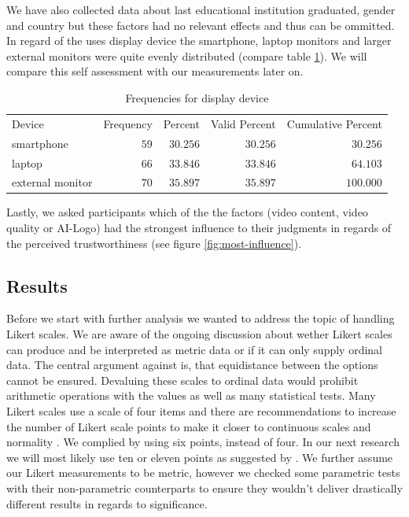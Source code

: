 \documentclass[
  a4paper,  %
  twoside,  %
  bibliography=totoc,
  headsepline,
  cleardoublepage=empty,
  parskip=half,
  draft=false
]{scrbook}
\begin{document}
We have also collected data about last educational institution graduated, gender and country but these factors had no relevant effects and thus can be ommitted. \\
In regard of the uses display device the smartphone, laptop monitors and larger external monitors were quite evenly distributed (compare table \ref{tab:frequenciesForDevice}). We will compare this self assessment with our measurements later on.
\begin{table}[h]
	\centering
	\caption{Frequencies for display device}
	\label{tab:frequenciesForDevice}
	{
		\begin{tabular}{lrrrr}
			\toprule
			Device & Frequency & Percent & Valid Percent & Cumulative Percent  \\
			\cmidrule[0.4pt]{1-5}
			smartphone & $59$ & $30.256$ & $30.256$ & $30.256$  \\
			laptop & $66$ & $33.846$ & $33.846$ & $64.103$  \\
			external monitor & $70$ & $35.897$ & $35.897$ & $100.000$  \\
			\bottomrule
		\end{tabular}
	}
\end{table}
Lastly, we asked participants which of the the factors (video content, video quality or AI-Logo) had the strongest influence to their judgments in regards of the perceived trustworthiness (see figure \ref{fig:most-influence}).

\subsection{Results}

Before we start with further analysis we wanted to address the topic of handling Likert scales. We are aware of the ongoing discussion about wether Likert scales can produce and be interpreted as metric data or if it can only supply ordinal data. The central argument against is, that equidistance between the options cannot be ensured. Devaluing these scales to ordinal data would prohibit arithmetic operations with the values as well as many statistical tests. Many Likert scales use a scale of four items and there are recommendations to increase the number of Likert scale points to make it closer to continuous scales and normality \cite{wuCanLikertScales2017a}. We complied by using six points, instead of four. In our next research we will most likely use ten or eleven points as suggested by . We further assume our Likert measurements to be metric, however we checked some parametric tests with their non-parametric counterparts to ensure they wouldn't deliver drastically different results in regards to significance.
\end{document}
